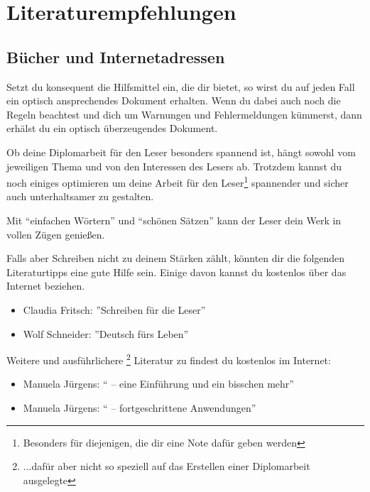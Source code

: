 
%

\chapter{Literaturempfehlungen}

\section{Bücher und Internetadressen}

Setzt du konsequent die Hilfsmittel ein, die \DMLLaTeX{} dir bietet, so wirst du auf jeden Fall ein optisch ansprechendes Dokument erhalten. Wenn du dabei auch noch die Regeln beachtest und dich um Warnungen und Fehlermeldungen kümmerst, dann erhälst du ein optisch überzeugendes Dokument.

Ob deine Diplomarbeit für den Leser besonders spannend ist, hängt sowohl vom jeweiligen Thema und von den Interessen des Lesers ab. Trotzdem kannst du noch einiges optimieren um deine Arbeit für den Leser\footnote{Besonders für diejenigen, die dir eine Note dafür geben werden} spannender und sicher auch unterhaltsamer zu gestalten.

Mit \enquote{einfachen Wörtern} und \enquote{schönen Sätzen} kann der Leser dein Werk in vollen Zügen genießen.

Falls aber Schreiben nicht zu deinem Stärken zählt, könnten dir die folgenden Literaturtipps eine gute Hilfe sein. Einige davon kannst du kostenlos über das Internet beziehen.

\begin{itemize}
	\item{Claudia Fritsch: ''Schreiben für die Leser''\cite{fritsch:schreiben_fuer_die_Leser}}
	\item{Wolf Schneider: ''Deutsch fürs Leben''\cite{schneider:deutsch_fuers_leben}}
\end{itemize}

Weitere und ausführlichere \footnote{...dafür aber nicht so speziell auf das Erstellen einer Diplomarbeit ausgelegte} Literatur zu \DMLLaTeX{} findest du  kostenlos im Internet:

\begin{itemize}
	\item{Manuela Jürgens: \enquote{\DMLLaTeX{} -- eine Einführung und ein bisschen mehr}\cite{juergens:latex1}}
	\item{Manuela Jürgens: \enquote{\DMLLaTeX{} -- fortgeschrittene Anwendungen}\cite{juergens:latex2}}
\end{itemize}

